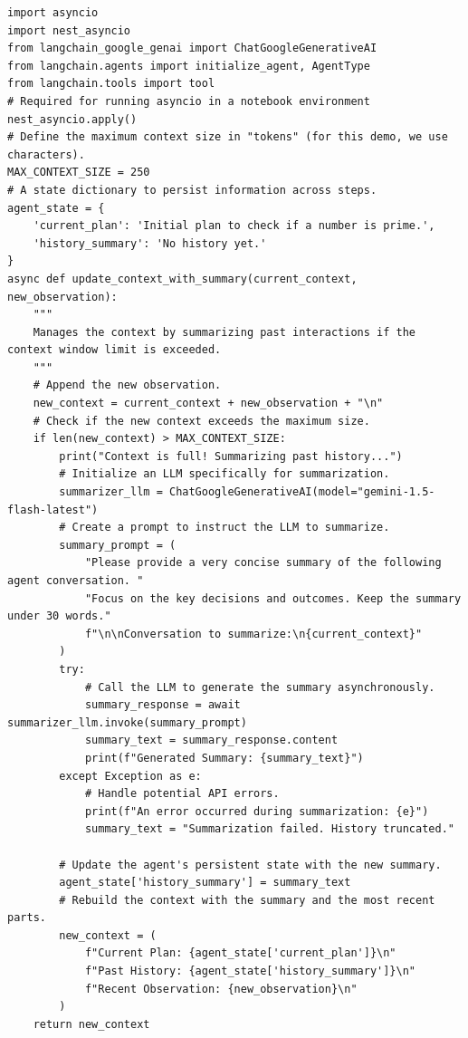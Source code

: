 \begin{listing}
\begin{verbatim}
import asyncio
import nest_asyncio
from langchain_google_genai import ChatGoogleGenerativeAI
from langchain.agents import initialize_agent, AgentType
from langchain.tools import tool
# Required for running asyncio in a notebook environment
nest_asyncio.apply()
# Define the maximum context size in "tokens" (for this demo, we use characters).
MAX_CONTEXT_SIZE = 250
# A state dictionary to persist information across steps.
agent_state = {
    'current_plan': 'Initial plan to check if a number is prime.',
    'history_summary': 'No history yet.'
}
async def update_context_with_summary(current_context, new_observation):
    """
    Manages the context by summarizing past interactions if the context window limit is exceeded.
    """
    # Append the new observation.
    new_context = current_context + new_observation + "\n"
    # Check if the new context exceeds the maximum size.
    if len(new_context) > MAX_CONTEXT_SIZE:
        print("Context is full! Summarizing past history...")
        # Initialize an LLM specifically for summarization.
        summarizer_llm = ChatGoogleGenerativeAI(model="gemini-1.5-flash-latest")
        # Create a prompt to instruct the LLM to summarize.
        summary_prompt = (
            "Please provide a very concise summary of the following agent conversation. "
            "Focus on the key decisions and outcomes. Keep the summary under 30 words."
            f"\n\nConversation to summarize:\n{current_context}"
        )
        try:
            # Call the LLM to generate the summary asynchronously.
            summary_response = await summarizer_llm.invoke(summary_prompt)
            summary_text = summary_response.content
            print(f"Generated Summary: {summary_text}")
        except Exception as e:
            # Handle potential API errors.
            print(f"An error occurred during summarization: {e}")
            summary_text = "Summarization failed. History truncated."

        # Update the agent's persistent state with the new summary.
        agent_state['history_summary'] = summary_text
        # Rebuild the context with the summary and the most recent parts.
        new_context = (
            f"Current Plan: {agent_state['current_plan']}\n"
            f"Past History: {agent_state['history_summary']}\n"
            f"Recent Observation: {new_observation}\n"
        )
    return new_context
\end{verbatim}
    \caption{模型上下文协议的简化实现（第 1 部分）。}\label{lst:MCP1}
\end{listing}
